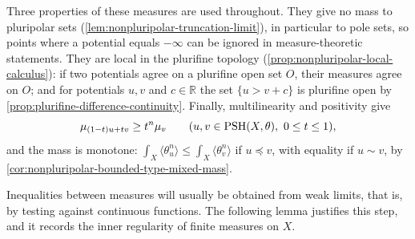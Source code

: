 Three properties of these measures are used throughout. They give no mass to pluripolar sets (\cref{lem:nonpluripolar-truncation-limit}), in particular to pole sets, so points where a potential equals $-\infty$ can be ignored in measure-theoretic statements. They are local in the plurifine topology (\cref{prop:nonpluripolar-local-calculus}): if two potentials agree on a plurifine open set $O$, their measures agree on $O$; and for potentials $u,v$ and $c\in\mathbb R$ the set $\{u>v+c\}$ is plurifine open by \cref{prop:plurifine-difference-continuity}. Finally, multilinearity and positivity give
\[
 \mu_{(1-t)u+tv}\geq t^n\mu_v
 \qquad(u,v\in\mathrm{PSH}(X,\theta),\ 0\leq t\leq1),
\]
and the mass is monotone: $\int_X\langle\theta_u^n\rangle\leq\int_X\langle\theta_v^n\rangle$ if $u\preceq v$, with equality if $u\sim v$, by \cref{cor:nonpluripolar-bounded-type-mixed-mass}.

Inequalities between measures will usually be obtained from weak limits, that is, by testing against continuous functions. The following lemma justifies this step, and it records the inner regularity of finite measures on $X$.

